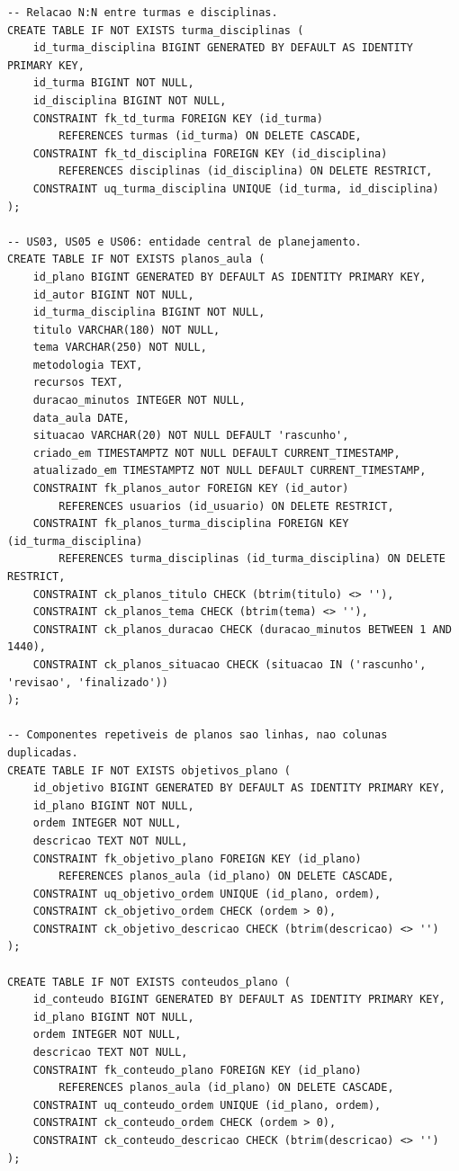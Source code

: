 \documentclass[12pt,a4paper,oneside]{report}
\begin{document}
\begin{lstlisting}[style=aulasql,caption={Código SQL completo do banco de dados Aula em Dia},label={lst:bd-ddl}]
-- Relacao N:N entre turmas e disciplinas.
CREATE TABLE IF NOT EXISTS turma_disciplinas (
    id_turma_disciplina BIGINT GENERATED BY DEFAULT AS IDENTITY PRIMARY KEY,
    id_turma BIGINT NOT NULL,
    id_disciplina BIGINT NOT NULL,
    CONSTRAINT fk_td_turma FOREIGN KEY (id_turma)
        REFERENCES turmas (id_turma) ON DELETE CASCADE,
    CONSTRAINT fk_td_disciplina FOREIGN KEY (id_disciplina)
        REFERENCES disciplinas (id_disciplina) ON DELETE RESTRICT,
    CONSTRAINT uq_turma_disciplina UNIQUE (id_turma, id_disciplina)
);

-- US03, US05 e US06: entidade central de planejamento.
CREATE TABLE IF NOT EXISTS planos_aula (
    id_plano BIGINT GENERATED BY DEFAULT AS IDENTITY PRIMARY KEY,
    id_autor BIGINT NOT NULL,
    id_turma_disciplina BIGINT NOT NULL,
    titulo VARCHAR(180) NOT NULL,
    tema VARCHAR(250) NOT NULL,
    metodologia TEXT,
    recursos TEXT,
    duracao_minutos INTEGER NOT NULL,
    data_aula DATE,
    situacao VARCHAR(20) NOT NULL DEFAULT 'rascunho',
    criado_em TIMESTAMPTZ NOT NULL DEFAULT CURRENT_TIMESTAMP,
    atualizado_em TIMESTAMPTZ NOT NULL DEFAULT CURRENT_TIMESTAMP,
    CONSTRAINT fk_planos_autor FOREIGN KEY (id_autor)
        REFERENCES usuarios (id_usuario) ON DELETE RESTRICT,
    CONSTRAINT fk_planos_turma_disciplina FOREIGN KEY (id_turma_disciplina)
        REFERENCES turma_disciplinas (id_turma_disciplina) ON DELETE RESTRICT,
    CONSTRAINT ck_planos_titulo CHECK (btrim(titulo) <> ''),
    CONSTRAINT ck_planos_tema CHECK (btrim(tema) <> ''),
    CONSTRAINT ck_planos_duracao CHECK (duracao_minutos BETWEEN 1 AND 1440),
    CONSTRAINT ck_planos_situacao CHECK (situacao IN ('rascunho', 'revisao', 'finalizado'))
);

-- Componentes repetiveis de planos sao linhas, nao colunas duplicadas.
CREATE TABLE IF NOT EXISTS objetivos_plano (
    id_objetivo BIGINT GENERATED BY DEFAULT AS IDENTITY PRIMARY KEY,
    id_plano BIGINT NOT NULL,
    ordem INTEGER NOT NULL,
    descricao TEXT NOT NULL,
    CONSTRAINT fk_objetivo_plano FOREIGN KEY (id_plano)
        REFERENCES planos_aula (id_plano) ON DELETE CASCADE,
    CONSTRAINT uq_objetivo_ordem UNIQUE (id_plano, ordem),
    CONSTRAINT ck_objetivo_ordem CHECK (ordem > 0),
    CONSTRAINT ck_objetivo_descricao CHECK (btrim(descricao) <> '')
);

CREATE TABLE IF NOT EXISTS conteudos_plano (
    id_conteudo BIGINT GENERATED BY DEFAULT AS IDENTITY PRIMARY KEY,
    id_plano BIGINT NOT NULL,
    ordem INTEGER NOT NULL,
    descricao TEXT NOT NULL,
    CONSTRAINT fk_conteudo_plano FOREIGN KEY (id_plano)
        REFERENCES planos_aula (id_plano) ON DELETE CASCADE,
    CONSTRAINT uq_conteudo_ordem UNIQUE (id_plano, ordem),
    CONSTRAINT ck_conteudo_ordem CHECK (ordem > 0),
    CONSTRAINT ck_conteudo_descricao CHECK (btrim(descricao) <> '')
);


\end{lstlisting}
\end{document}

